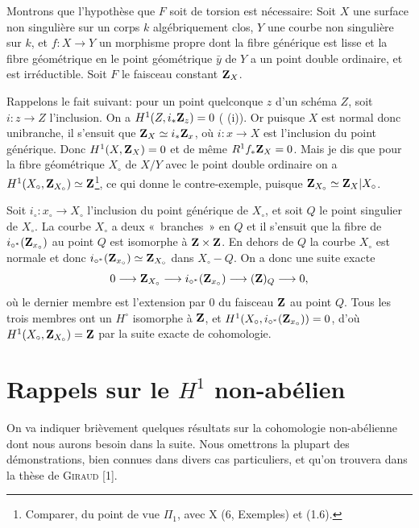 \documentclass[10pt]{../fichiers-configuration-latex/smfart}
\begin{document}
Montrons que l'hypothèse que $F$ soit de torsion est nécessaire: Soit
$X$ une surface non singulière sur un corps $k$ algébriquement clos,
$Y$ une courbe non singulière sur $k$, et $f:X\rightarrow Y$ un
morphisme propre dont la fibre générique est lisse et la fibre
géométrique en le point géométrique $\bar{y}$ de $Y$ a un point double
ordinaire, et est irréductible. Soit $F$ le faisceau constant
$\mathbf{Z}_X$.

Rappelons le fait suivant: pour un point quelconque $z$ d'un schéma
$Z$, soit $i:z\rightarrow Z$ l'inclusion. On a
$H^1(Z,i_{\ast}\mathbf{Z}_z)=0$ ( (i)). Or puisque $X$ est
normal donc unibranche, il s'ensuit que $\mathbf{Z}_X\simeq
i_{\ast}\mathbf{Z}_x$, où $i:x\rightarrow X$ est l'inclusion du point
générique. Donc $H^1(X,\mathbf{Z}_X)=0$ et de même
$R^1f_{\ast}\mathbf{Z}_X=0$. Mais je dis que pour la fibre géométrique
$X_{\circ}$ de $X/Y$ avec le point double ordinaire on a
$H^1(X_{\circ},\mathbf{Z}_{X_{\circ}})\simeq \mathbf{Z}$\footnote[1]{Comparer, du point de vue $\Pi_1$, avec  X (6, Exemples) et (1.6).}, ce qui donne le contre-exemple, puisque
$\mathbf{Z}_{X_{\circ}}\simeq \mathbf{Z}_X| X_{\circ}$.

Soit $i_{\circ}:x_{\circ}\rightarrow X_{\circ}$ l'inclusion du point
générique de $X_{\circ}$, et soit $Q$ le point singulier de
$X_{\circ}$. La courbe $X_{\circ}$ a deux « branches »  en $Q$ et
il s'ensuit que la fibre de $i_{\circ^{\ast}}(\mathbf{Z}_{x_{\circ}})$
au point $Q$ est isomorphe à $\mathbf{Z}\times \mathbf{Z}$. En dehors
de $Q$ la courbe $X_{\circ}$ est normale et donc
$i_{\circ^{\ast}}(\mathbf{Z}_{x_{\circ}})\simeq
\mathbf{Z}_{X_{\circ}}$ dans $X_{\circ}-Q$. On a donc une suite exacte
$$
0\longrightarrow \mathbf{Z}_{X_{\circ}}\longrightarrow
i_{\circ^{\ast}}(\mathbf{Z}_{x_{\circ}})\longrightarrow
(\mathbf{Z})_Q\longrightarrow 0{},
$$
où le dernier membre est l'extension par $0$ du faisceau $\mathbf{Z}$ au
point $Q$. Tous les trois membres ont un $H^{\circ}$ isomorphe à
$\mathbf{Z}$, et $H^1(X_{\circ},
i_{\circ^{\ast}}(\mathbf{Z}_{x_{\circ}}))=0$, d'où
$H^1(X_{\circ},\mathbf{Z}_{X_{\circ}})=\mathbf{Z}$\pageoriginale 
par la suite exacte de cohomologie.

\section{Rappels sur le $H^1$ non-abélien}

On va indiquer brièvement quelques résultats sur la cohomologie
non-abélienne dont nous aurons besoin dans la suite. Nous omettrons la
plupart des démonstrations, bien connues dans divers cas particuliers,
et qu'on trouvera dans la thèse de \textsc{Giraud} [1].
\end{document}
